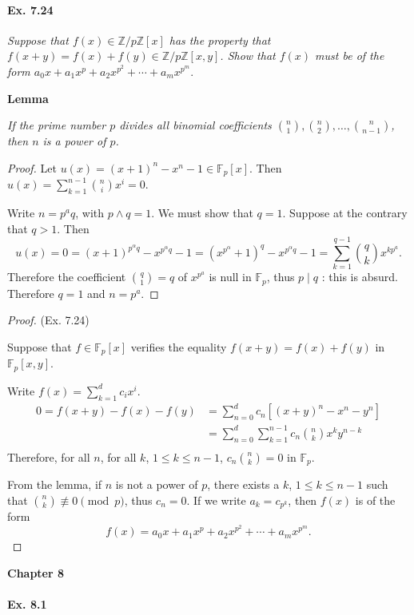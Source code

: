 \documentclass[11pt,a4paper]{article}
\newcommand{\Z}{\mathbb{Z}}
\newcommand{\F}{\mathbb{F}}
\begin{document}
\paragraph{Ex. 7.24}

{\it Suppose that $f(x) \in \Z/p\Z[x]$ has the property that $f(x+y) = f(x) + f(y) \in \Z/p\Z[x,y]$. Show that $f(x)$ must be of the form $a_0x +a_1x^p+a_2x^{p^2}+\cdots+a_mx^{p^m}.$
}

\bigskip

{\bf Lemma} {\it If the prime number $p$ divides all binomial coefficients $\binom{n}{1}, \binom{n}{2},\ldots, \binom{n}{n-1}$, then $n$ is a power of $p$.
\begin{proof}
Let $ u(x) = (x+1)^n -x^n - 1 \in \F_p[x]$. Then $u(x) = \sum\limits_{k=1}^{n-1} \binom{n}{i} x^i = 0$.

Write $n = p^a q$, with $p\wedge q = 1$. We must show that $q=1$. Suppose at the contrary that $q>1$. Then 
$$u(x)= 0 = (x+1)^{p^\alpha q} - x^{p^\alpha q} - 1=(x^{p^\alpha} + 1)^q -x^{p^\alpha q} - 1=\sum\limits_{k=1}^{q-1} \binom{q}{k} x^{kp^a}.$$
Therefore the coefficient $\binom{q}{1} = q$ of $x^{p^a}$ is null in $\F_p$, thus $p \mid q$ : this is absurd. Therefore $q=1$ and $n = p^a$.
\end{proof}


\begin{proof}(Ex. 7.24)

Suppose that $f\in \F_p[x]$ verifies the equality $f(x+y) = f(x)+f(y)$ in $\F_p[x,y]$.

Write $f(x) = \sum\limits_{k=1}^d c_i x^i$.
\begin{align*}
0 = f(x+y) - f(x) -f(y)&= \sum_{n=0}^d c_n[(x+y)^n-x ^n - y^n]\\
&=\sum_{n=0}^d \sum_{k=1}^{n-1} c_n\binom{n}{k} x^ky ^{n-k}\\
\end{align*}
Therefore,  for all $n$, for all $k$, $1\leq k \leq n-1$, $c_n \binom{n}{k} = 0$ in $\F_p$.

From the lemma, if $n$ is not a power of $p$, there exists a $k$, $1\leq k \leq n-1$ such that $\binom{n}{k} \not \equiv 0 \pmod p$, thus $c_n = 0$.
If we write $a_k = c_{p^k}$, then $f(x)$ is of the form
$$f(x) = a_0 x+a_1x^p +a_2 x^{p^2}+\cdots+a_m x^{p^m}.$$
\end{proof}

{ \Large \bf Chapter 8} 

\paragraph{Ex. 8.1}

}
\end{document}
